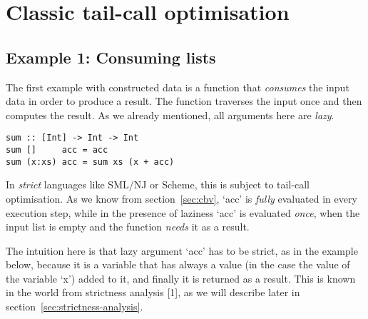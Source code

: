 \documentclass[diploma]{softlab-thesis}
\begin{document}
\section {Classic tail-call optimisation}
\label{sec:classic-tco-examples}





\subsection {Example 1: Consuming lists}
\label{sec:example1}

The first example with constructed data is a 
function that \textit{consumes} the input data in 
order to produce a result.  The function traverses 
the input once and then computes the result. As we 
already mentioned, all arguments here are \textit{lazy}.

\begin{verbatim}
sum :: [Int] -> Int -> Int
sum []     acc = acc
sum (x:xs) acc = sum xs (x + acc)
\end{verbatim}

In \textit{strict} languages like SML/NJ or Scheme,
this is subject to tail-call optimisation. As we know from section~\ref{sec:cbv},
`acc' is \textit{fully} evaluated in every execution step, while in the
presence of laziness `acc' is evaluated \textit{once}, when the input 
list is empty and the function \textit{needs} it as a result.

The intuition here is that lazy argument `acc' has to be strict, as in the example below,
because it is a variable that has always a value (in the case the value of the variable `x') added to it,
and finally it is returned as a result. This is known in the world from strictness analysis [1], as we 
will describe later in section~\ref{sec:strictness-analysis}.
\end{document}
